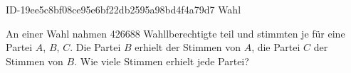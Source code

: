 \begin{exercise}
      {ID-19ee5c8bf08ce95e6bf22db2595a98bd4f4a79d7}
      {Wahl}
  \ifproblem\problem\par
    An einer Wahl nahmen \num{426688} Wahllberechtigte teil und stimmten je für eine
    Partei $A$, $B$, $C$. Die Partei $B$ erhielt  der Stimmen von $A$,
    die Partei $C$  der Stimmen von $B$.
    Wie viele Stimmen erhielt jede Partei?
  \fi
\end{exercise}
